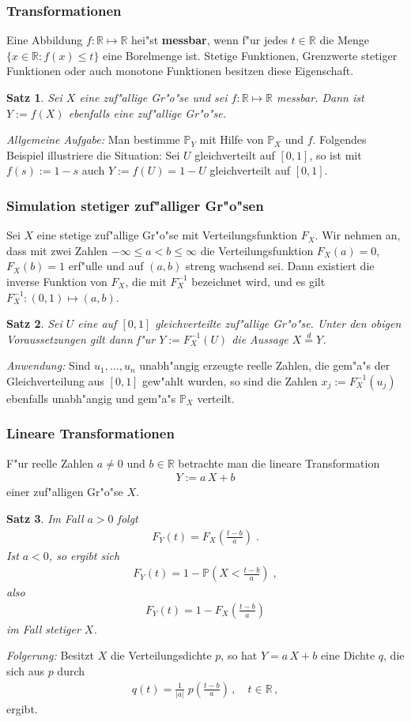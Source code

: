 \documentclass[ngerman,draft,parskip=half,twoside]{scrartcl}
\newtheorem{thm}{Satz}[section]
\newcommand*{\R}{\mathbb{R}}      %
\newcommand*{\WKM}{\mathbb{P}}      %
\begin{document}
\subsubsection{Transformationen}
Eine Abbildung $f\colon\R\mapsto\R$ hei"st \textbf{messbar}, wenn f"ur jedes $t\in\R$ die
Menge $\{x\in \R : f(x)\le t\}$ eine Borelmenge ist. Stetige Funktionen, Grenzwerte stetiger
Funktionen oder auch monotone Funktionen besitzen diese Eigenschaft.
\begin{thm}
Sei $X$ eine zuf"allige Gr"o"se und sei $f\colon\R\mapsto\R$ messbar. Dann ist $Y:=f(X)$ ebenfalls
eine zuf"allige Gr"o"se.
\end{thm}
\textit{Allgemeine Aufgabe:} Man bestimme $\WKM_Y$ mit Hilfe von $\WKM_X$ und $f$.
Folgendes Beispiel illustriere die Situation: Sei $U$ gleichverteilt auf $[0,1]$, so ist mit
$f(s):=1-s$ auch $Y:=f(U)=1-U$ gleichverteilt auf $[0,1]$.
\subsubsection{Simulation stetiger zuf"alliger Gr"o"sen}
Sei $X$ eine stetige zuf"allige Gr"o"se mit Verteilungsfunktion $F_X$. Wir nehmen an,
dass mit zwei Zahlen
$-\infty\le a<b\le\infty$ die Verteilungsfunktion $F_X(a)=0$, $F_X(b)=1$ erf"ulle  und
auf $(a,b)$ streng wachsend sei. Dann
existiert die inverse Funktion von $F_X$, die mit $F_X^{-1}$ bezeichnet wird, und es
gilt $F_X^{-1}\colon(0,1)\mapsto (a,b)$.
\begin{thm}
Sei $U$ eine auf $[0,1]$ gleichverteilte zuf"allige Gr"o"se. Unter den
obigen Voraussetzungen gilt dann f"ur $Y:=F_X^{-1}(U)$ die Aussage
$X\stackrel{d}{=} Y$.
\end{thm}
\textit{Anwendung:} Sind $u_1,\ldots,u_n$ unabh"angig erzeugte reelle Zahlen, die gem"a"s der
Gleichverteilung aus $[0,1]$ gew"ahlt wurden, so sind die Zahlen $x_j:= F_X^{-1}(u_j)$ ebenfalls unabh"angig
und gem"a"s $\WKM_X$ verteilt.
\subsubsection{Lineare Transformationen}
F"ur reelle Zahlen $a\not=0$ und $b\in\R$ betrachte man die lineare Transformation
\begin{gather*}
  Y:=a\,X+ b
\end{gather*}
einer zuf"alligen Gr"o"se $X$.
\begin{thm}
Im Fall $a>0$ folgt
  \begin{gather*}
    F_Y(t)=F_X\left(\frac{t-b}{a}\right)\;.
  \end{gather*}
Ist $a<0$, so ergibt sich
  \begin{gather*}
    F_Y(t)=1-\WKM\left(X<\frac{t-b}{a}\right)\;,
  \end{gather*}
also
  \begin{gather*}
    F_Y(t)=1-F_X\left(\frac{t-b}{a}\right)
  \end{gather*}
im Fall stetiger $X$.
\end{thm}
\textit{Folgerung:} Besitzt $X$ die Verteilungsdichte $p$, so hat $Y=a\,X+b$ eine Dichte $q$,
die sich aus $p$ durch
\begin{gather*}
  q(t)=\frac{1}{|a|}\;p\left(\frac{t-b}{a}\right)\,,\quad t\in\R\,,
\end{gather*}
ergibt.
\end{document}
